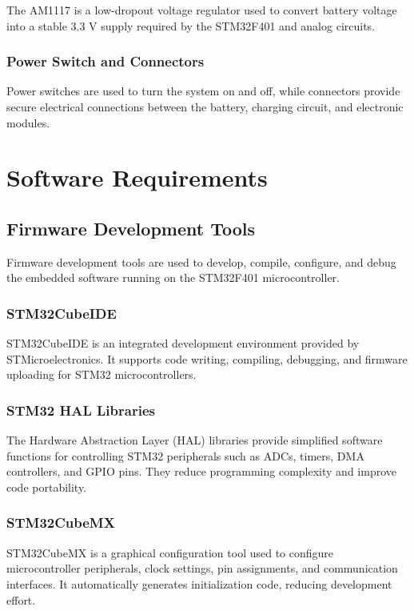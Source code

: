 The AM1117 is a low-dropout voltage regulator used to convert battery voltage into a stable 3.3 V supply required by the STM32F401 and analog circuits.

\subsubsection{Power Switch and Connectors}

Power switches are used to turn the system on and off, while connectors provide secure electrical connections between the battery, charging circuit, and electronic modules.
\section{Software Requirements}
\subsection{Firmware Development Tools}
Firmware development tools are used to develop, compile, configure, and debug the embedded software running on the STM32F401 microcontroller.

\subsubsection{STM32CubeIDE}

STM32CubeIDE is an integrated development environment provided by STMicroelectronics. It supports code writing, compiling, debugging, and firmware uploading for STM32 microcontrollers.

\subsubsection{STM32 HAL Libraries}

The Hardware Abstraction Layer (HAL) libraries provide simplified software functions for controlling STM32 peripherals such as ADCs, timers, DMA controllers, and GPIO pins. They reduce programming complexity and improve code portability.

\subsubsection{STM32CubeMX}

STM32CubeMX is a graphical configuration tool used to configure microcontroller peripherals, clock settings, pin assignments, and communication interfaces. It automatically generates initialization code, reducing development effort.
